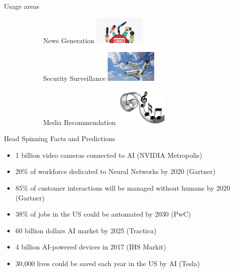 \documentclass{beamer}
\begin{document}
\begin{frame}{Usage areas}
\begin{figure}
\begin{subfigure}{.25\textwidth}
\end{subfigure}
\end{figure}
\begin{figure}
\centering
\begin{subfigure}{.25\textwidth}
  \centering
  News Generation
  \includegraphics[width=2.5cm]{figures/news-generation}
\end{subfigure}%
\begin{subfigure}{.25\textwidth}
  \centering
  Security Surveillance
  \includegraphics[width=2.5cm]{figures/security-surveillance}
\end{subfigure}
\begin{subfigure}{.25\textwidth}
  \centering
  Media Recommendation
  \includegraphics[width=2.5cm]{figures/music-and-movie-recommendation}
\end{subfigure}
\end{figure}
\end{frame}

\begin{frame}{Head Spinning Facts and Predictions}
\begin{itemize}
\item 1 billion video cameras connected to AI (NVIDIA Metropolis)
\item 20\% of workforce dedicated to Neural Networks by 2020 (Gartner)
\item 85\% of customer interactions will be managed without humans by 2020 (Gartner)
\item 38\% of jobs in the US could be automated by 2030 (PwC)
\item 60 billion dollars AI market by 2025 (Tractica)
\item 4 billion AI-powered devices in 2017 (IHS Markit)
\item 30,000 lives could be saved each year in the US by AI (Tesla)
\end{itemize}
\end{frame}
\end{document}
